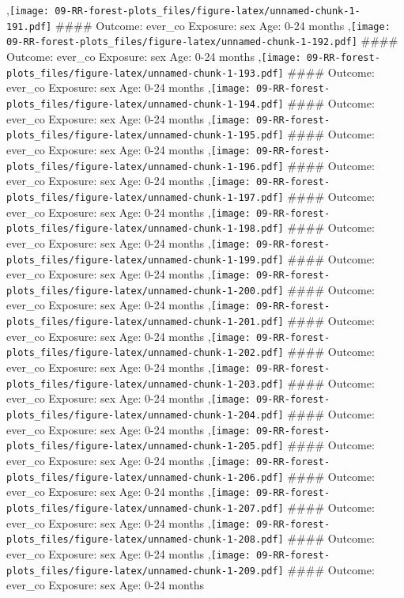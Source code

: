 \documentclass[
  9pt,
]{book}
\begin{document}
,\texttt{[image: 09-RR-forest-plots\_files/figure-latex/unnamed-chunk-1-191.pdf]}
\#\#\#\# Outcome: ever\_co Exposure: sex Age: 0-24 months
,\texttt{[image: 09-RR-forest-plots\_files/figure-latex/unnamed-chunk-1-192.pdf]}
\#\#\#\# Outcome: ever\_co Exposure: sex Age: 0-24 months
,\texttt{[image: 09-RR-forest-plots\_files/figure-latex/unnamed-chunk-1-193.pdf]}
\#\#\#\# Outcome: ever\_co Exposure: sex Age: 0-24 months
,\texttt{[image: 09-RR-forest-plots\_files/figure-latex/unnamed-chunk-1-194.pdf]}
\#\#\#\# Outcome: ever\_co Exposure: sex Age: 0-24 months
,\texttt{[image: 09-RR-forest-plots\_files/figure-latex/unnamed-chunk-1-195.pdf]}
\#\#\#\# Outcome: ever\_co Exposure: sex Age: 0-24 months
,\texttt{[image: 09-RR-forest-plots\_files/figure-latex/unnamed-chunk-1-196.pdf]}
\#\#\#\# Outcome: ever\_co Exposure: sex Age: 0-24 months
,\texttt{[image: 09-RR-forest-plots\_files/figure-latex/unnamed-chunk-1-197.pdf]}
\#\#\#\# Outcome: ever\_co Exposure: sex Age: 0-24 months
,\texttt{[image: 09-RR-forest-plots\_files/figure-latex/unnamed-chunk-1-198.pdf]}
\#\#\#\# Outcome: ever\_co Exposure: sex Age: 0-24 months
,\texttt{[image: 09-RR-forest-plots\_files/figure-latex/unnamed-chunk-1-199.pdf]}
\#\#\#\# Outcome: ever\_co Exposure: sex Age: 0-24 months
,\texttt{[image: 09-RR-forest-plots\_files/figure-latex/unnamed-chunk-1-200.pdf]}
\#\#\#\# Outcome: ever\_co Exposure: sex Age: 0-24 months
,\texttt{[image: 09-RR-forest-plots\_files/figure-latex/unnamed-chunk-1-201.pdf]}
\#\#\#\# Outcome: ever\_co Exposure: sex Age: 0-24 months
,\texttt{[image: 09-RR-forest-plots\_files/figure-latex/unnamed-chunk-1-202.pdf]}
\#\#\#\# Outcome: ever\_co Exposure: sex Age: 0-24 months
,\texttt{[image: 09-RR-forest-plots\_files/figure-latex/unnamed-chunk-1-203.pdf]}
\#\#\#\# Outcome: ever\_co Exposure: sex Age: 0-24 months
,\texttt{[image: 09-RR-forest-plots\_files/figure-latex/unnamed-chunk-1-204.pdf]}
\#\#\#\# Outcome: ever\_co Exposure: sex Age: 0-24 months
,\texttt{[image: 09-RR-forest-plots\_files/figure-latex/unnamed-chunk-1-205.pdf]}
\#\#\#\# Outcome: ever\_co Exposure: sex Age: 0-24 months
,\texttt{[image: 09-RR-forest-plots\_files/figure-latex/unnamed-chunk-1-206.pdf]}
\#\#\#\# Outcome: ever\_co Exposure: sex Age: 0-24 months
,\texttt{[image: 09-RR-forest-plots\_files/figure-latex/unnamed-chunk-1-207.pdf]}
\#\#\#\# Outcome: ever\_co Exposure: sex Age: 0-24 months
,\texttt{[image: 09-RR-forest-plots\_files/figure-latex/unnamed-chunk-1-208.pdf]}
\#\#\#\# Outcome: ever\_co Exposure: sex Age: 0-24 months
,\texttt{[image: 09-RR-forest-plots\_files/figure-latex/unnamed-chunk-1-209.pdf]}
\#\#\#\# Outcome: ever\_co Exposure: sex Age: 0-24 months
\end{document}
